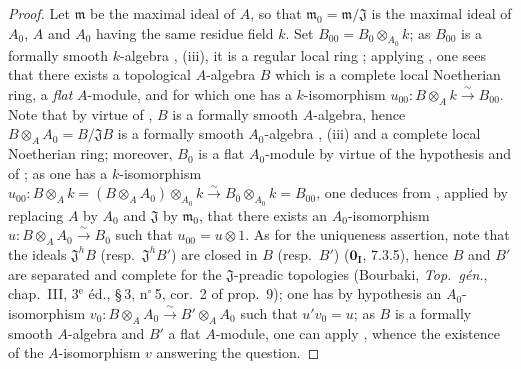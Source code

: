 \begin{proof}
Let $\mathfrak{m}$ be the maximal ideal of $A$, so that $\mathfrak{m}_0=\mathfrak{m}/\mathfrak{J}$ is the maximal ideal of $A_0$, $A$ and $A_0$ having the same residue field $k$.
Set $B_{00}=B_0\otimes_{A_0} k$; as $B_{00}$ is a formally smooth $k$-algebra , (iii), it is a regular local ring ; applying , one sees that there exists a topological $A$-algebra $B$ which is a complete local Noetherian ring, a \emph{flat} $A$-module, and for which one has a $k$-isomorphism $u_{00}:B\otimes_A k\xrightarrow{\sim} B_{00}$.
Note that by virtue of , $B$ is a formally smooth $A$-algebra, hence $B\otimes_A A_0=B/\mathfrak{J}B$ is a formally smooth $A_0$-algebra , (iii) and a complete local Noetherian ring; moreover, $B_0$ is a flat $A_0$-module by virtue of the hypothesis and of ; as one has a $k$-isomorphism $u_{00}:B\otimes_A k=(B\otimes_A A_0)\otimes_{A_0} k\xrightarrow{\sim} B_0\otimes_{A_0} k = B_{00}$, one deduces from , applied by replacing $A$ by $A_0$ and $\mathfrak{J}$ by $\mathfrak{m}_0$, that there exists an $A_0$-isomorphism $u:B\otimes_A A_0\xrightarrow{\sim} B_0$ such that $u_{00}=u\otimes 1$.
As for the uniqueness assertion, note that the ideals $\mathfrak{J}^h B$ (resp.\ $\mathfrak{J}^h B'$) are closed in $B$ (resp.\ $B'$) ($\mathbf{0_I}$, 7.3.5), hence $B$ and $B'$ are separated and complete for the $\mathfrak{J}$-preadic topologies (Bourbaki, \emph{Top.\ g\'{e}n.}, chap.~III, 3$^\text{e}$ \'{e}d., \S\,3, n$^\circ$\,5, cor.~2 of prop.~9); one has by hypothesis an $A_0$-isomorphism $v_0:B\otimes_A A_0\xrightarrow{\sim} B'\otimes_A A_0$ such that $u'v_0=u$; as $B$ is a formally smooth $A$-algebra and $B'$ a flat $A$-module, one can apply , whence the existence of the $A$-isomorphism $v$ answering the question.
\end{proof}

